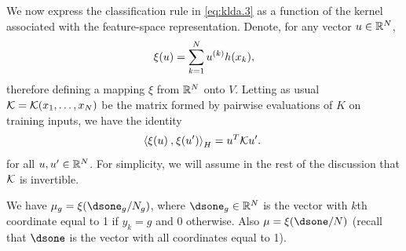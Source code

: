 We now express the classification rule in \cref{eq:klda.3} as a function of the kernel associated with the feature-space representation.
Denote, for any vector $u \in {\mathbb{R}}^N$, 
\[
\xi(u) = \sum_{k=1}^N u^{(k)} h(x_k),
\]
 therefore defining a mapping $\xi$ from ${\mathbb{R}}^N$ onto $V$. Letting as usual ${\mathcal K} = {\mathcal K}(x_1, \ldots, x_N)$ be the matrix formed by pairwise evaluations of $K$ on training inputs, we have the identity
\[
{\langle {\xi(u)}\mathbin{,} {\xi(u')}\rangle}_H = u^T {\mathcal K} u'.\
\]
for all $u,u'\in{\mathbb{R}}^N$. For simplicity, we will assume in the rest of the discussion that ${\mathcal K}$ is invertible.

We have $\mu_g = \xi(\dsone_g/N_g)$, where $\dsone_g\in \mR^N$ is the vector with $k$th coordinate equal to 1 if $y_k = g$ and 0 otherwise. Also $\mu = \xi(\dsone/N)$ (recall that $\dsone$ is the vector with all coordinates equal to 1).

